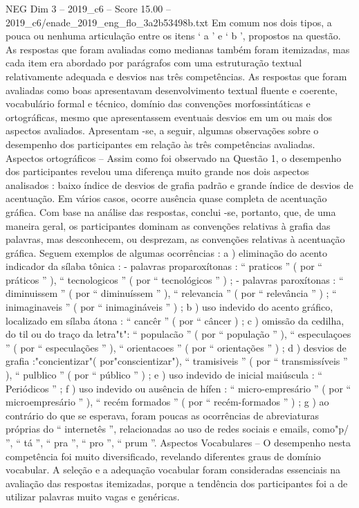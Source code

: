 \begin{textsample}{NEG Dim 3 – 2019\_c6 – Score 15.00 – 2019\_c6/enade\_2019\_eng\_flo\_3a2b53498b.txt}
Em comum nos dois tipos, a pouca ou nenhuma articulação entre os itens ‘ a ’ e ‘ b ’, propostos na questão.
As respostas que foram avaliadas como medianas também foram itemizadas, mas cada item era abordado por parágrafos com uma estruturação textual relativamente adequada e desvios nas três competências.
As respostas que foram avaliadas como boas apresentavam desenvolvimento textual fluente e coerente, vocabulário formal e técnico, domínio das convenções morfossintáticas e ortográficas, mesmo que apresentassem eventuais desvios em um ou mais dos aspectos avaliados.
Apresentam -se, a seguir, algumas observações sobre o desempenho dos participantes em relação às três competências avaliadas.
Aspectos ortográficos – Assim como foi observado na Questão 1, o desempenho dos participantes revelou uma diferença muito grande nos dois aspectos analisados : baixo índice de desvios de grafia padrão e grande índice de desvios de acentuação.
Em vários casos, ocorre ausência quase completa de acentuação gráfica.
Com base na análise das respostas, conclui -se, portanto, que, de uma maneira geral, os participantes dominam as convenções relativas à grafia das palavras, mas desconhecem, ou desprezam, as convenções relativas à acentuação gráfica.
Seguem exemplos de algumas ocorrências : a ) eliminação do acento indicador da sílaba tônica : - palavras proparoxítonas : “ praticos ” ( por “ práticos ” ), “ tecnologicos ” ( por “ tecnológicos ” ) ; - palavras paroxítonas : “ diminuissem ” ( por “ diminuíssem ” ), “ relevancia ” ( por “ relevância ” ) ; “ inimaginaveis ” ( por “ inimagináveis ” ) ; b ) uso indevido do acento gráfico, localizado em sílaba átona : “ cancêr ” ( por “ câncer ) ; c ) omissão da cedilha, do til ou do traço da letra"t": “ populacão ” ( por “ população ” ), “ especulaçoes ” ( por “ especulações ” ), “ orientacoes ” ( por “ orientações ” ) ; d ) desvios de grafia :"concientizar"( por"conscientizar"), “ tramisiveis ” ( por “ transmissíveis ” ), “ pulblico ” ( por “ público ” ) ; e ) uso indevido de inicial maiúscula : “ Periódicos ” ; f ) uso indevido ou ausência de hífen : “ micro-empresário ” ( por “ microempresário ” ), “ recém formados ” ( por “ recém-formados ” ) ; g ) ao contrário do que se esperava, foram poucas as ocorrências de abreviaturas próprias do “ internetês ”, relacionadas ao uso de redes sociais e emails, como"p/ ”, “ tá ”, “ pra ”, “ pro ”, “ prum ”.
Aspectos Vocabulares – O desempenho nesta competência foi muito diversificado, revelando diferentes graus de domínio vocabular.
A seleção e a adequação vocabular foram consideradas essenciais na avaliação das respostas itemizadas, porque a tendência dos participantes foi a de utilizar palavras muito vagas e genéricas.

\end{textsample}
